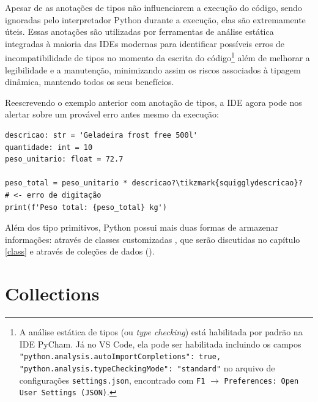 Apesar de as anotações de tipos não influenciarem a execução do código, sendo ignoradas pelo interpretador Python durante a execução, elas são extremamente úteis.
Essas anotações são utilizadas por ferramentas de análise estática integradas à maioria das IDEs modernas para
identificar possíveis erros de incompatibilidade de tipos no momento da escrita do
código\footnote{A análise estática de tipos (ou \emph{type checking}) está habilitada por padrão na IDE PyCham.
Já no VS Code, ela pode ser habilitada incluindo os campos
\texttt{"python.analysis.autoImportCompletions": true,} \texttt{"python.analysis.typeCheckingMode": "standard"} no arquivo de
configurações \texttt{settings.json}, encontrado com \texttt{F1} $\rightarrow$ \texttt{Preferences: Open User Settings (JSON)}.
}
além de melhorar a legibilidade e a manutenção, minimizando assim os riscos associados à tipagem dinâmica, mantendo
todos os seus benefícios.

Reescrevendo o exemplo anterior com anotação de tipos, a IDE agora pode nos alertar sobre um provável erro antes
mesmo da execução:
\begin{verbatim}
descricao: str = 'Geladeira frost free 500l'
quantidade: int = 10
peso_unitario: float = 72.7

peso_total = peso_unitario * descricao?\tikzmark{squigglydescricao}?   # <- erro de digitação
print(f'Peso total: {peso_total} kg')
\end{verbatim}
%

Além dos tipo primitivos, Python possui mais duas formas de armazenar informações: através de classes customizadas
, que serão discutidas no capítulo \ref{class} e através de coleções de
dados ().




\section{Collections}

